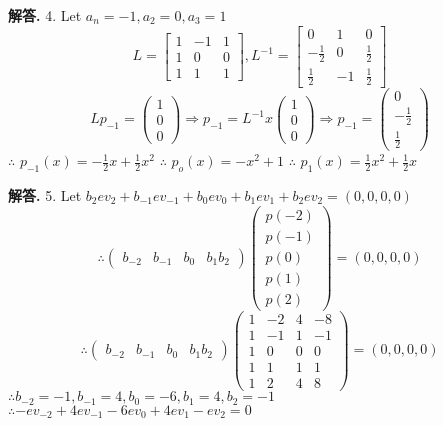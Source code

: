 \documentclass[12pt, a4paper, oneside]{article}
\newenvironment{solution}{\par\noindent\textbf{解答. }}{\par}
\begin{document}
\begin{CJK}{UTF8}{gbsn}
\begin{solution}
  4. Let $a_n=-1,a_2=0, a_3=1$ 
  $$ L = \begin{bmatrix}
    1 & -1 & 1 \\ 1 & 0 & 0 \\ 1 & 1 & 1
  \end{bmatrix}, L^{-1} = \begin{bmatrix}
    0 & 1 & 0 \\
    -\frac{1}{2} & 0 & \frac{1}{2} \\
    \frac{1}{2} & -1 & \frac{1}{2}
  \end{bmatrix}$$
  $$Lp_{-1}=\begin{pmatrix}
    1 \\ 0 \\ 0
  \end{pmatrix} \Rightarrow p_{-1} = L^{-1}x\begin{pmatrix}
    1 \\ 0 \\ 0
  \end{pmatrix} \Rightarrow p_{-1} = \begin{pmatrix}
    0 \\ -\frac{1}{2} \\ \frac{1}{2}
  \end{pmatrix}$$
  $\therefore$ $p_{-1}(x) = -\frac{1}{2}x + \frac{1}{2}x^2$ \newline
  $\therefore$ $p_o(x) = -x^2 + 1$ \newline
  $\therefore$ $p_1(x)=\frac{1}{2}x^2+\frac{1}{2}x$
\end{solution}

\begin{solution}
  5. Let $b_2ev_2 + b_{-1}ev_{-1} + b_0ev_0+b_1ev_1+b_2ev_2 = (0, 0, 0, 0)$
  $$\therefore \begin{pmatrix}
    b_{-2} & b_{-1} & b_{0} & b_{1} b_{2} 
  \end{pmatrix} \begin{pmatrix}
    p(-2) \\ p(-1) \\ p(0) \\ p(1) \\ p(2)
  \end{pmatrix} = (0, 0, 0, 0)$$
  $$\therefore \begin{pmatrix}
    b_{-2} & b_{-1} & b_{0} & b_{1} b_{2} 
  \end{pmatrix}  \begin{pmatrix}
    1 & -2 & 4 & -8 \\
    1 & -1 & 1 & -1 \\
    1 & 0 & 0 & 0 \\
    1 & 1 & 1 & 1 \\
    1 & 2 & 4 & 8
  \end{pmatrix}  = (0, 0, 0, 0)$$
  $\therefore b_{-2} = -1, b_{-1} = 4, b_{0} = -6, b_{1}=4, b_2 = -1$  \newline
  $\therefore -ev_{-2} + 4ev_{-1} -6ev_0 + 4ev_1 - ev_2 = 0$
\end{solution}


\end{CJK}
\end{document}
